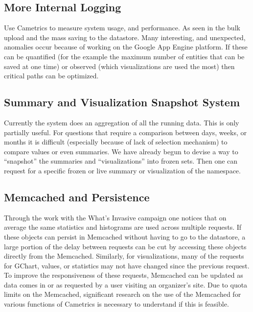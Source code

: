 \documentclass[10pt,a4paper,english]{article}
\begin{document}

\hypertarget{more-internal-logging}{}
\subsection*{More Internal Logging}
\label{more-internal-logging}

Use Cametrics to measure system usage, and performance. As seen in the bulk upload and the mass saving to the datastore. Many interesting, and unexpected, anomalies occur because of working on the Google App Engine platform. If these can be quantified (for the example the maximum number of entities that can be saved at one time) or observed (which visualizations are used the most) then critical paths can be optimized.



\hypertarget{summary-and-visualization-snapshot-system}{}
\subsection*{Summary and Visualization Snapshot System}
\label{summary-and-visualization-snapshot-system}

Currently the system does an aggregation of all the running data. This is only partially useful. For questions that require a comparison between days, weeks, or months it is difficult (especially because of lack of selection mechanism) to compare values or even summaries. We have already begun to devise a way to ``snapshot'' the summaries and ``visualizations'' into frozen sets. Then one can request for a specific frozen or live summary or visualization of the namespace.



\hypertarget{memcached-and-persistence}{}
\subsection*{Memcached and Persistence}
\label{memcached-and-persistence}

Through the work with the What's Invasive campaign one notices that on average the same statistics and histograms are used across multiple requests. If these objects can persist in Memcached without having to go to the datastore, a large portion of the delay between requests can be cut by accessing these objects directly from the Memcached. Similarly, for visualizations, many of the requests for GChart, values, or statistics may not have changed since the previous request. To improve the responsiveness of these requests, Memcached can be updated as data comes in or as requested by a user visiting an organizer's site. Due to quota limits on the Memcached, significant research on the use of the Memcached for various functions of Cametrics is necessary to understand if this is feasible.
\end{document}
